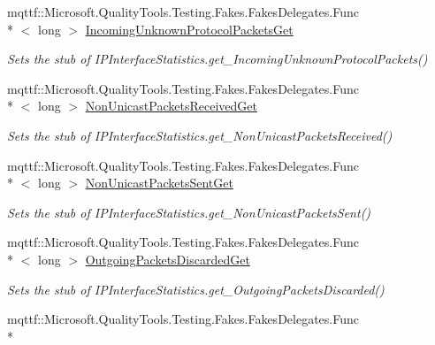 \begin{DoxyCompactItemize}
mqttf\-::\-Microsoft.\-Quality\-Tools.\-Testing.\-Fakes.\-Fakes\-Delegates.\-Func\\*
$<$ long $>$ \hyperlink{class_system_1_1_net_1_1_network_information_1_1_fakes_1_1_stub_i_p_interface_statistics_ac84491436332a40a92f86f2c85cb5a69}{Incoming\-Unknown\-Protocol\-Packets\-Get}
\begin{DoxyCompactList}\small\item\em Sets the stub of I\-P\-Interface\-Statistics.\-get\-\_\-\-Incoming\-Unknown\-Protocol\-Packets()\end{DoxyCompactList}\item 
mqttf\-::\-Microsoft.\-Quality\-Tools.\-Testing.\-Fakes.\-Fakes\-Delegates.\-Func\\*
$<$ long $>$ \hyperlink{class_system_1_1_net_1_1_network_information_1_1_fakes_1_1_stub_i_p_interface_statistics_a1dd612daeafd737b475dd44ccca436a3}{Non\-Unicast\-Packets\-Received\-Get}
\begin{DoxyCompactList}\small\item\em Sets the stub of I\-P\-Interface\-Statistics.\-get\-\_\-\-Non\-Unicast\-Packets\-Received()\end{DoxyCompactList}\item 
mqttf\-::\-Microsoft.\-Quality\-Tools.\-Testing.\-Fakes.\-Fakes\-Delegates.\-Func\\*
$<$ long $>$ \hyperlink{class_system_1_1_net_1_1_network_information_1_1_fakes_1_1_stub_i_p_interface_statistics_a8ba5cd9f3a5eb35a65e0bfbaa9283701}{Non\-Unicast\-Packets\-Sent\-Get}
\begin{DoxyCompactList}\small\item\em Sets the stub of I\-P\-Interface\-Statistics.\-get\-\_\-\-Non\-Unicast\-Packets\-Sent()\end{DoxyCompactList}\item 
mqttf\-::\-Microsoft.\-Quality\-Tools.\-Testing.\-Fakes.\-Fakes\-Delegates.\-Func\\*
$<$ long $>$ \hyperlink{class_system_1_1_net_1_1_network_information_1_1_fakes_1_1_stub_i_p_interface_statistics_ae6f8f624e3c6811a03f42f73722ab731}{Outgoing\-Packets\-Discarded\-Get}
\begin{DoxyCompactList}\small\item\em Sets the stub of I\-P\-Interface\-Statistics.\-get\-\_\-\-Outgoing\-Packets\-Discarded()\end{DoxyCompactList}\item 
mqttf\-::\-Microsoft.\-Quality\-Tools.\-Testing.\-Fakes.\-Fakes\-Delegates.\-Func\\*

\end{DoxyCompactItemize}
